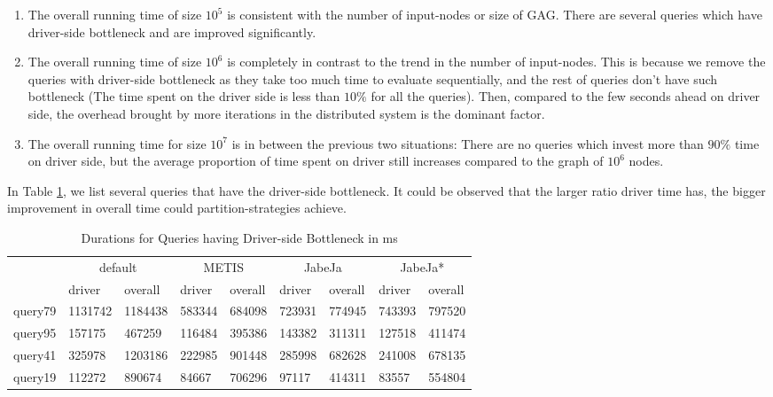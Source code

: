 \begin{enumerate}
    \item The overall running time of size $10^5$ is consistent with the number of input-nodes or size of GAG. There are several queries which have driver-side bottleneck and are improved significantly.
    \item The overall running time of size $10^6$ is completely in contrast to the trend in the number of input-nodes. This is because we remove the queries with driver-side bottleneck as they take too much time to evaluate sequentially, and the rest of queries don't have such bottleneck (The time spent on the driver side is less than $10\%$ for all the queries). Then, compared  to the few seconds ahead on driver side, the overhead brought by more iterations in the distributed system is the dominant factor.
    \item The overall running time for size $10^7$ is in between the previous two situations: There are no queries which invest more than $90\%$ time on driver side, but the average proportion of time spent on driver still increases compared to the graph of $10^6$ nodes.
\end{enumerate}
In Table \ref{driver-queries}, we list several queries that have the driver-side bottleneck. It could be observed that the larger ratio driver time has, the bigger improvement in overall time could partition-strategies achieve.
\begin{table}[] \small
\centering
\caption{Durations for Queries having Driver-side Bottleneck in ms}
\label{driver-queries}
\begin{tabular}{l|ll|ll|ll|ll|}
        & \multicolumn{2}{c|}{default} & \multicolumn{2}{c|}{METIS} & \multicolumn{2}{c|}{JabeJa} & \multicolumn{2}{c|}{JabeJa*} \\ \cline{2-9} 
        & driver        & overall      & driver      & overall      & driver       & overall      & driver       & overall       \\ \hline
query79 & 1131742       & 1184438      & 583344      & 684098       & 723931       & 774945       & 743393       & 797520        \\
query95 & 157175        & 467259       & 116484      & 395386       & 143382       & 311311       & 127518       & 411474        \\
query41 & 325978        & 1203186      & 222985      & 901448       & 285998       & 682628       & 241008       & 678135        \\
query19 & 112272        & 890674       & 84667       & 706296       & 97117        & 414311       & 83557        & 554804       
\end{tabular}
\end{table}
